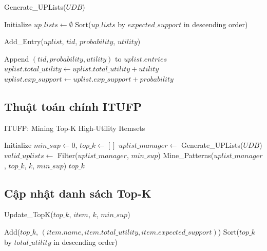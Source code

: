 \documentclass[conference]{IEEEtran}
\begin{document}
\begin{algorithm}[H]
\caption{Generate\_UPLists($UDB$)}
Initialize $up\_lists \gets \emptyset$\;
\Return Sort($up\_lists$ by $expected\_support$ in descending order)\;
\end{algorithm}

\begin{algorithm}[H]
\caption{Add\_Entry($uplist$, $tid$, $probability$, $utility$)}
Append $(tid, probability, utility)$ to $uplist.entries$\;
$uplist.total\_utility \gets uplist.total\_utility + utility$\;
$uplist.exp\_support \gets uplist.exp\_support + probability$\;
\end{algorithm}

\subsection{Thuật toán chính ITUFP}

\begin{algorithm}[H]
\caption{ITUFP: Mining Top-K High-Utility Itemsets}
Initialize $min\_sup \gets 0$, $top\_k \gets []$\;
$uplist\_manager \gets$ Generate\_UPLists($UDB$)\;
$valid\_uplists \gets$ Filter($uplist\_manager$, $min\_sup$)\;
Mine\_Patterns($uplist\_manager$, $top\_k$, $k$, $min\_sup$)\;
\Return $top\_k$\;
\end{algorithm}

\subsection{Cập nhật danh sách Top-K}

\begin{algorithm}[H]
\caption{Update\_TopK($top\_k$, $item$, $k$, $min\_sup$)}
Add($top\_k$, $(item.name, item.total\_utility, item.expected\_support)$)\;
Sort($top\_k$ by $total\_utility$ in descending order)\;
\end{algorithm}
\end{document}
